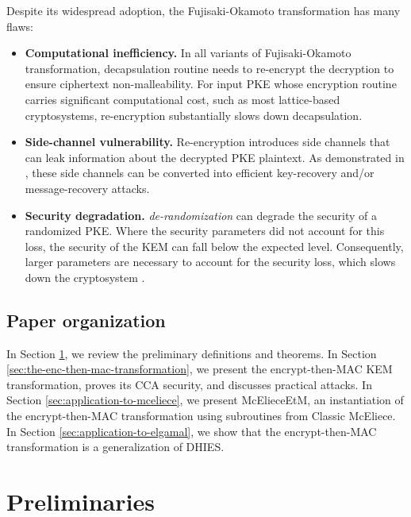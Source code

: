 \documentclass[runningheads]{llncs}
\begin{document}
Despite its widespread adoption, the Fujisaki-Okamoto transformation has many flaws: \begin{itemize}
    \item \textbf{Computational inefficiency.} In all variants of Fujisaki-Okamoto transformation, decapsulation routine needs to re-encrypt the decryption to ensure ciphertext non-malleability. For input PKE whose encryption routine carries significant computational cost, such as most lattice-based cryptosystems, re-encryption substantially slows down decapsulation.
    \item \textbf{Side-channel vulnerability.} Re-encryption introduces side channels that can leak information about the decrypted PKE plaintext. As demonstrated in \cite{DBLP:journals/tches/UenoXTITH22,DBLP:journals/tches/TanakaUXITH23,DBLP:conf/acns/Huguenin-Dumittan20,DBLP:conf/ccs/HermelinkN0S24,DBLP:journals/tches/GoyMGL24,DBLP:journals/iacr/LiCSCGLWW24,DBLP:journals/tches/KunduCSKMV24,DBLP:conf/acns/MondalKBKV24,DBLP:journals/tches/DongG25,DBLP:conf/acns/WangBD24}, these side channels can be converted into efficient key-recovery and/or message-recovery attacks.
    \item \textbf{Security degradation.} \textit{de-randomization} can degrade the security of a randomized PKE. Where the security parameters did not account for this loss, the security of the KEM can fall below the expected level. Consequently, larger parameters are necessary to account for the security loss, which slows down the cryptosystem \cite{cryptoeprint:2021/912,DBLP:journals/iacr/Bernstein21}.
\end{itemize}

\subsection{Paper organization}\label{sec:paper-organization}
In Section \ref{sec:preliminaries}, we review the preliminary definitions and theorems. In Section \ref{sec:the-enc-then-mac-transformation}, we present the encrypt-then-MAC KEM transformation, proves its CCA security, and discusses practical attacks. In Section \ref{sec:application-to-mceliece}, we present McElieceEtM, an instantiation of the encrypt-then-MAC transformation using subroutines from Classic McEliece. In Section \ref{sec:application-to-elgamal}, we show that the encrypt-then-MAC transformation is a generalization of DHIES. 

\section{Preliminaries}\label{sec:preliminaries}
\end{document}
